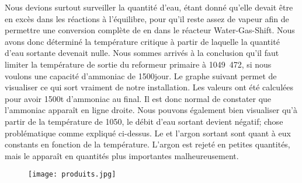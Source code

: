 \newpage
Nous devions surtout surveiller la quantité d'eau, étant donné qu'elle devait être en excès dans les réactions à
l'équilibre, pour qu'il reste assez de vapeur afin de permettre une conversion complète de  en  dans le
réacteur Water-Gas-Shift.
Nous avons donc déterminé la température critique à partir de laquelle la quantité d'eau sortante devenait nulle.
Nous sommes arrivés à la conclusion qu'il faut limiter la température de sortie du reformeur primaire à
\unit{1049.472}{\kelvin}, si nous voulons une capacité d'ammoniac de \unit{1500}{\ton\per jour}.
Le graphe suivant permet de visualiser ce qui sort vraiment de notre installation. Les valeurs ont été calculées pour
avoir 1500t d'ammoniac au final. Il est donc normal de constater que l'ammoniac apparaît en ligne droite.
Nous pouvons également bien visualiser qu'à partir de la température de \unit{1050}{\kelvin}, le débit d'eau sortant devient
négatif; chose problématique comme expliqué ci-dessus.
Le  et l'argon sortant sont quant à eux constants en fonction de la température. L'argon est rejeté en petites quantités, mais le 
apparaît en quantités plus importantes malheureusement.
\begin{figure}[ht!]
\centering
\texttt{[image: produits.jpg]}
\label{produits_sortants}
\end{figure}
